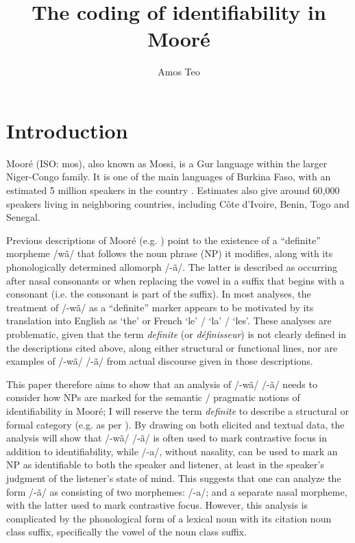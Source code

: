 \documentclass[output=paper]{langsci/langscibook}
\title{The coding of identifiability in Mooré}
\author{Amos Teo \affiliation{University of Oregon}
}
\begin{document}


\section{Introduction}\label{sec:teo:1}

Mooré (ISO: mos), also known as Mossi, is a Gur language within the larger Niger-Congo family. It is one of the main languages of Burkina Faso, with an estimated 5 million speakers in the country \citep{Lewis2013}. Estimates also give around 60,000 speakers living in neighboring countries, including Côte d’Ivoire, Benin, Togo and Senegal.

Previous descriptions of Mooré (e.g. \citealt{Peterson1971,canu1974,Canu1976,Nikiema1989}) point to the existence of a “definite” morpheme /wã/ that follows the noun phrase (NP) it modifies, along with its phonologically determined allomorph /-ã/. The latter is described as occurring after nasal consonants or when replacing the vowel in a suffix that begins with a consonant (i.e. the consonant is part of the suffix). In most analyses, the treatment of /-wã/ as a “definite” marker appears to be motivated by its translation into English as ‘the’ or French ‘le’ / ‘la’ / ‘les’. These analyses are problematic, given that the term \textit{definite} (or \textit{définisseur}) is not clearly defined in the descriptions cited above, along either structural or functional lines, nor are examples of /-wã/ {\Tilde} /-ã/ from actual discourse given in those descriptions.

This paper therefore aims to show that an analysis of /-wã/ {\Tilde} /-ã/ needs to consider how NPs are marked for the semantic / pragmatic notions of identifiability in Mooré; I will reserve the term \textit{definite} to describe a structural or formal category (e.g. as per \citealt{DuBois1980}). By drawing on both elicited and textual data, the analysis will show that /-wã/ {\Tilde} /-ã/ is often used to mark contrastive focus in addition to identifiability, while /-a/, without nasality, can be used to mark an NP as identifiable to both the speaker and listener, at least in the speaker’s judgment of the listener’s state of mind. This suggests that one can analyze the form /-ã/ as consisting of two morphemes: /-a/; and a separate nasal morpheme, with the latter used to mark contrastive focus. However, this analysis is complicated by the phonological form of a lexical noun with its citation noun class suffix, specifically the vowel of the noun class suffix.
\end{document}
